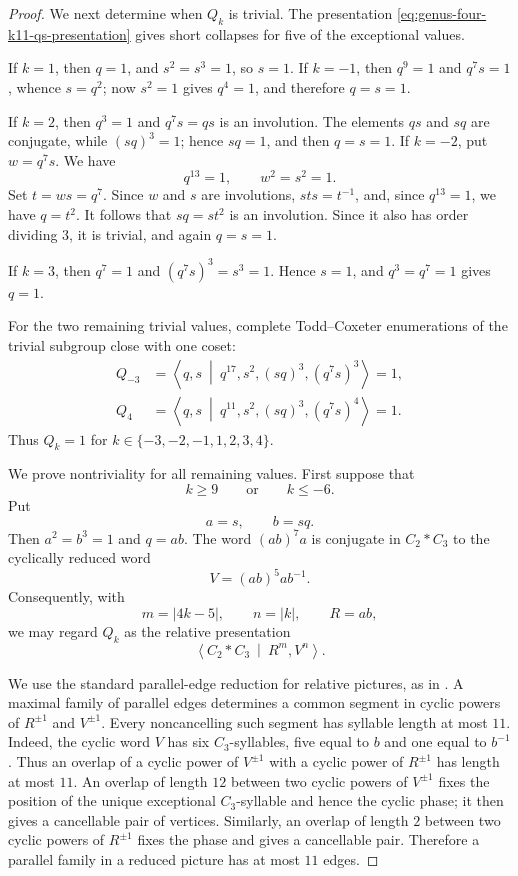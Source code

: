 \documentclass{article}
\begin{document}
\begin{proof}
We next determine when $Q_k$ is trivial.  The presentation
\eqref{eq:genus-four-k11-qs-presentation} gives short collapses for
five of the exceptional values.

If $k=1$, then $q=1$, and $s^2=s^3=1$, so $s=1$.  If $k=-1$, then
$q^9=1$ and $q^7s=1$, whence $s=q^2$; now $s^2=1$ gives $q^4=1$, and
therefore $q=s=1$.

If $k=2$, then $q^3=1$ and $q^7s=qs$ is an involution.  The elements
$qs$ and $sq$ are conjugate, while $(sq)^3=1$; hence $sq=1$, and then
$q=s=1$.  If $k=-2$, put $w=q^7s$.  We have
\[
 q^{13}=1,
 \qquad
 w^2=s^2=1.
\]
Set $t=ws=q^7$.  Since $w$ and $s$ are involutions,
$sts=t^{-1}$, and, since $q^{13}=1$, we have $q=t^2$.  It follows that
$sq=st^2$ is an involution.  Since it also has order dividing $3$, it
is trivial, and again $q=s=1$.

If $k=3$, then $q^7=1$ and $(q^7s)^3=s^3=1$.  Hence $s=1$, and
$q^3=q^7=1$ gives $q=1$.

For the two remaining trivial values, complete Todd--Coxeter
enumerations of the trivial subgroup close with one coset:
\[
\begin{aligned}
 Q_{-3}&=\left\langle q,s\ \middle|\
 q^{17},s^2,(sq)^3,(q^7s)^3\right\rangle=1,\\
 Q_4&=\left\langle q,s\ \middle|\
 q^{11},s^2,(sq)^3,(q^7s)^4\right\rangle=1.
\end{aligned}
\]
Thus $Q_k=1$ for
$k\in\{-3,-2,-1,1,2,3,4\}$.

We prove nontriviality for all remaining values.  First suppose that
\[
 k\geq9
 \qquad\text{or}\qquad
 k\leq-6.
\]
Put
\[
 a=s,
 \qquad
 b=sq.
\]
Then $a^2=b^3=1$ and $q=ab$.  The word $(ab)^7a$ is conjugate in
$C_2*C_3$ to the cyclically reduced word
\[
 V=(ab)^5ab^{-1}.
\]
Consequently, with
\[
 m=|4k-5|,
 \qquad
 n=|k|,
 \qquad
 R=ab,
\]
we may regard $Q_k$ as the relative presentation
\begin{equation}
\label{eq:genus-four-k11-relative-picture}
 \left\langle C_2*C_3\ \middle|\ R^m,V^n\right\rangle .
\end{equation}

We use the standard parallel-edge reduction for relative pictures, as
in \cite[Sections~3--4]{ET}.  A maximal family of parallel edges
determines a common segment in cyclic powers of
$R^{\pm1}$ and $V^{\pm1}$.  Every noncancelling such segment has
syllable length at most $11$.  Indeed, the cyclic word $V$ has six
$C_3$-syllables, five equal to $b$ and one equal to $b^{-1}$.  Thus an
overlap of a cyclic power of $V^{\pm1}$ with a cyclic power of
$R^{\pm1}$ has length at most $11$.  An overlap of length $12$ between
two cyclic powers of $V^{\pm1}$ fixes the position of the unique
exceptional $C_3$-syllable and hence the cyclic phase; it then gives a
cancellable pair of vertices.  Similarly, an overlap of length $2$
between two cyclic powers of $R^{\pm1}$ fixes the phase and gives a
cancellable pair.  Therefore a parallel family in a reduced picture
has at most $11$ edges.


\end{proof}
\end{document}

